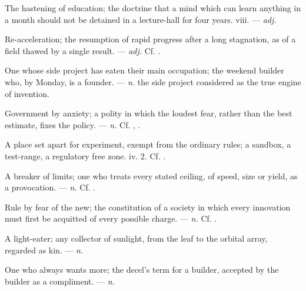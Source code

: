  The hastening of education; the doctrine that a mind which can learn anything in a month should not be detained in a lecture-hall for four years.   viii. ---  \textit{adj.}

 Re-acceleration; the resumption of rapid progress after a long stagnation, as of a field thawed by a single result.   ---  \textit{adj.} Cf. .

 One whose side project has eaten their main occupation; the weekend builder who, by Monday, is a founder. ---  \textit{n.} the side project considered as the true engine of invention.

 Government by anxiety; a polity in which the loudest fear, rather than the best estimate, fixes the policy. ---  \textit{n.} Cf. , .

 A place set apart for experiment, exempt from the ordinary rules; a sandbox, a test-range, a regulatory free zone.   iv. 2. Cf. .

 A breaker of limits; one who treats every stated ceiling, of speed, size or yield, as a provocation. ---  \textit{n.} Cf. .

 Rule by fear of the new; the constitution of a society in which every innovation must first be acquitted of every possible charge. ---  \textit{n.} Cf. .

 A light-eater; any collector of sunlight, from the leaf to the orbital array, regarded as kin.  ---  \textit{n.}

  One who always wants more; the decel's term for a builder, accepted by the builder as a compliment.   ---  \textit{n.}

